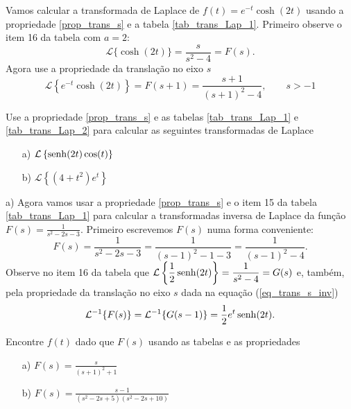 \begin{ex}Vamos calcular a transformada de Laplace de $f(t)=e^{-t}\cosh(2t)$ usando a propriedade \ref{prop_trans_s} e a tabela \ref{tab_trans_Lap_1}. Primeiro observe o item 16 da tabela com $a=2$:
$$
\mathcal{L}\{\cosh(2t)\}=\frac{s}{ s^2-4}=F(s).
$$
Agora use a propriedade da translação no eixo $s$
\begin{equation}
\mathcal{L}\left\{e^{-t}\cosh(2t)\right\} =F(s+1)=\frac{s+1}{ (s+1)^2-4},\qquad s>-1
\end{equation}


\end{ex}
\begin{prob}Use a propriedade \ref{prop_trans_s} e as tabelas \ref{tab_trans_Lap_1} e \ref{tab_trans_Lap_2} para calcular as seguintes transformadas de Laplace
\begin{itemize}
 \item[a)] $\displaystyle \mathcal{L}\left\{\operatorname{senh}(2t)\cos(t)\right\}$
 \item[b)] $\displaystyle \mathcal{L}\left\{(4+t^2)e^t\right\}$
\end{itemize}
\end{prob}
\begin{ex}
 \item[a)] Agora vamos usar a propriedade \ref{prop_trans_s} e o item 15 da tabela \ref{tab_trans_Lap_1} para calcular a transformadas inversa de Laplace da função $F(s)=\frac{1}{s^2-2s-3}$. Primeiro escrevemos $F(s)$ numa forma conveniente:
$$
F(s)=\frac{1}{s^2-2s-3}=\frac{1}{(s-1)^2-1-3}=\frac{1}{(s-1)^2-4}.
$$
Observe no item 16 da tabela que $\displaystyle\mathcal{L}\left\{\frac{1}{2}\operatorname{senh}(2t)\right\}=\frac{1}{ s^2-4}=G(s)$ e, também, pela propriedade da translação no eixo $s$ dada na equação (\ref{eq_trans_s_inv})
$$
\mathcal{L}^{-1}\{F(s)\}=\mathcal{L}^{-1}\{G(s-1)\}=\frac{1}{2}e^{t}\operatorname{senh}(2t).
$$
\end{ex}

\begin{prob}Encontre $f(t)$ dado que $F(s)$ usando as tabelas e as propriedades
\begin{itemize}
 \item[a)] $F(s)=\frac{s}{(s+1)^2+1}$
\item[b)] $F(s)=\frac{s-1}{(s^2-2s+5)(s^2-2s+10)}$
\end{itemize}
\end{prob}
